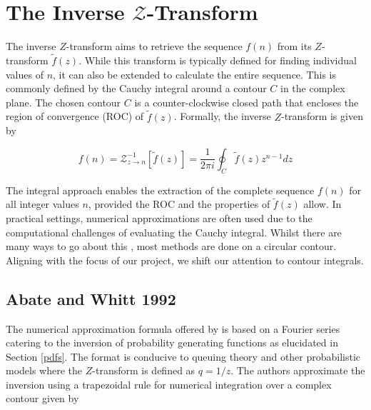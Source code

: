 \documentclass[a4paper]{report}
\begin{document}
\section{The Inverse \texorpdfstring{$\mathcal{Z}$}{Lg}-Transform}\label{section:inverse_z}
The inverse $Z$-transform aims to retrieve the sequence $f(n)$ from its $Z$-transform $\tilde{f}(z)$. While this transform is typically defined for finding individual values of $n$, it can also be extended to calculate the entire sequence. This is commonly defined by the Cauchy integral around a contour $C$ in the complex plane. The chosen contour $C$ is a counter-clockwise closed path that encloses the region of convergence (ROC) of $\tilde{f}(z)$. Formally, the inverse $Z$-transform is given by

\begin{equation}\label{inverse_z-transform}
	f(n) = \mathcal{Z}^{-1}_{z \rightarrow n}[\tilde{f}(z)] = \frac{1}{2\pi i} \oint_C \tilde{f}(z)z^{n-1}dz
\end{equation}

The integral approach enables the extraction of the complete sequence $f(n)$ for all integer values $n$, provided the ROC and the properties of $\tilde{f}(z)$ allow. In practical settings, numerical approximations are often used due to the computational challenges of evaluating the Cauchy integral. Whilst there are many ways to go about this \citep{merrikh2014linearsys, rajkovic2004method, horvath2020numerical}, most methods are done on a circular contour. Aligning with the focus of our project, we shift our attention to contour integrals.

\subsection{Abate and Whitt 1992}\label{section:abate_whitt}
The numerical approximation formula offered by \citet{AbateWhitt1992a, AbateWhitt1992b} is based on a Fourier series catering to the inversion of probability generating functions as elucidated in Section \ref{pdfs}. The format is conducive to queuing theory and other probabilistic models where the $Z$-transform is defined as $q = 1 / z$. The authors approximate the inversion using a trapezoidal rule for numerical integration over a complex contour given by
\end{document}
